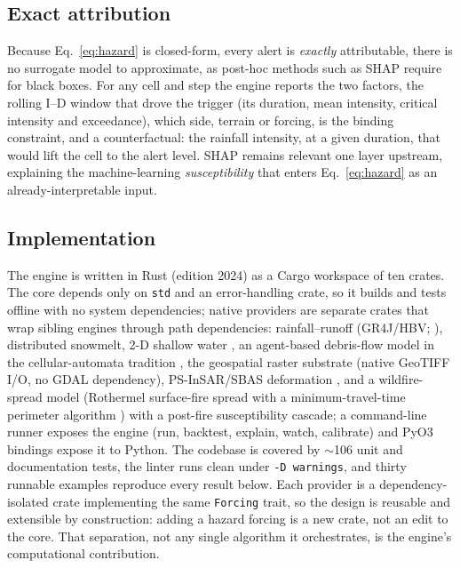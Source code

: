 \documentclass[authoryear,preprint,review,12pt]{elsarticle}
\begin{document}
\subsection{Exact attribution}

Because Eq.~\eqref{eq:hazard} is closed-form, every alert is \emph{exactly}
attributable, there is no surrogate model to approximate, as post-hoc methods
such as SHAP \citep{lundberg2017} require for black boxes. For any cell and step
the engine reports the two factors, the rolling I--D window that drove the trigger
(its duration, mean intensity, critical intensity and exceedance), which
side, terrain or forcing, is the binding constraint, and a counterfactual: the
rainfall intensity, at a given duration, that would lift the cell to the alert
level. SHAP remains relevant one layer upstream, explaining the machine-learning
\emph{susceptibility} that enters Eq.~\eqref{eq:hazard} as an
already-interpretable input.

\subsection{Implementation}

The engine is written in Rust (edition 2024) as a Cargo workspace of ten
crates. The core depends only on \texttt{std} and an error-handling crate, so it
builds and tests offline with no system dependencies; native providers are
separate crates that wrap sibling engines through path dependencies:
rainfall--runoff (GR4J/HBV; \citealp{perrin2003,seibert2012}), distributed
snowmelt, 2-D shallow water \citep{audusse2004,toro1994}, an agent-based
debris-flow model in the cellular-automata tradition \citep{dambrosio2003}, the geospatial raster substrate (native GeoTIFF I/O, no GDAL
dependency), PS-InSAR/SBAS deformation \citep{ferretti2001,berardino2002}, and a wildfire-spread model (Rothermel surface-fire spread \citep{andrews2018} with a minimum-travel-time perimeter algorithm \citep{finney1998}) with a
post-fire susceptibility cascade; a command-line runner exposes the engine
(run, backtest, explain, watch, calibrate) and PyO3 bindings expose it to Python. The codebase is covered by
$\sim$106 unit and documentation tests, the linter runs clean under
\texttt{-D warnings}, and thirty runnable examples reproduce every result below.
Each provider is a dependency-isolated crate implementing the same \texttt{Forcing}
trait, so the design is reusable and extensible by construction: adding a hazard
forcing is a new crate, not an edit to the core. That separation, not any single
algorithm it orchestrates, is the engine's computational contribution.
\end{document}

